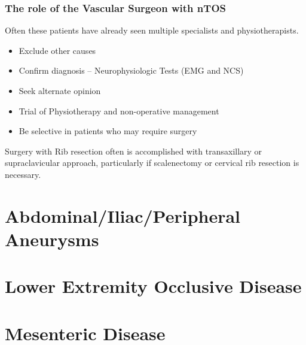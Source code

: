\documentclass[
]{book}
\begin{document}
\hypertarget{the-role-of-the-vascular-surgeon-with-ntos}{%
\subsection{The role of the Vascular Surgeon with nTOS}\label{the-role-of-the-vascular-surgeon-with-ntos}}

Often these patients have already seen multiple specialists and
physiotherapists.

\begin{itemize}
\item
  Exclude other causes
\item
  Confirm diagnosis -- Neurophysiologic Tests (EMG and NCS)
\item
  Seek alternate opinion
\item
  Trial of Physiotherapy and non-operative management
\item
  Be selective in patients who may require surgery
\end{itemize}

Surgery with Rib resection often is accomplished with transaxillary or
supraclavicular approach, particularly if scalenectomy or cervical rib
resection is necessary.

\hypertarget{abdominaliliacperipheral-aneurysms}{%
\chapter{Abdominal/Iliac/Peripheral Aneurysms}\label{abdominaliliacperipheral-aneurysms}}

\hypertarget{section}{%
\section{}\label{section}}

\hypertarget{lower-extremity-occlusive-disease}{%
\chapter{Lower Extremity Occlusive Disease}\label{lower-extremity-occlusive-disease}}

\hypertarget{section-1}{%
\section{}\label{section-1}}

\hypertarget{mesenteric-disease}{%
\chapter{Mesenteric Disease}\label{mesenteric-disease}}
\end{document}
